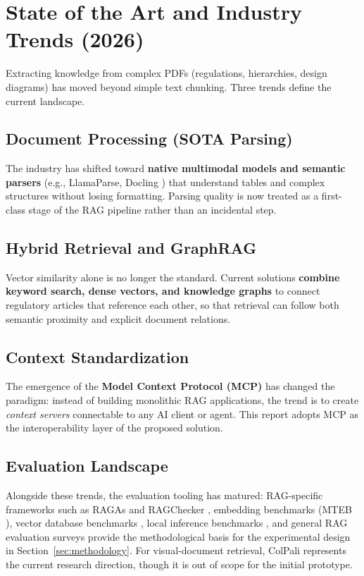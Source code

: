 \documentclass[11pt,a4paper]{article}
\begin{document}
\section{State of the Art and Industry Trends (2026)}
\label{sec:sota}

Extracting knowledge from complex PDFs (regulations, hierarchies, design
diagrams) has moved beyond simple text chunking. Three trends define the
current landscape.

\subsection{Document Processing (SOTA Parsing)}

The industry has shifted toward \textbf{native multimodal models and semantic
parsers} (e.g., LlamaParse, Docling \cite{docling}) that understand tables and
complex structures without losing formatting. Parsing quality is now treated
as a first-class stage of the RAG pipeline rather than an incidental step.

\subsection{Hybrid Retrieval and GraphRAG}

Vector similarity alone is no longer the standard. Current solutions
\textbf{combine keyword search, dense vectors, and knowledge graphs}
\cite{graphrag} to connect regulatory articles that reference each other, so
that retrieval can follow both semantic proximity and explicit document
relations.

\subsection{Context Standardization}

The emergence of the \textbf{Model Context Protocol (MCP)}
\cite{mcp-spec,mcp-sdk} has changed the paradigm: instead of building
monolithic RAG applications, the trend is to create \emph{context servers}
connectable to any AI client or agent. This report adopts MCP as the
interoperability layer of the proposed solution.

\subsection{Evaluation Landscape}

Alongside these trends, the evaluation tooling has matured: RAG-specific
frameworks such as RAGAs \cite{ragas} and RAGChecker \cite{ragchecker},
embedding benchmarks (MTEB \cite{mteb}), vector database benchmarks
\cite{vdbbench}, local inference benchmarks \cite{localbench}, and general RAG
evaluation surveys \cite{rag-survey} provide the methodological basis for the
experimental design in Section~\ref{sec:methodology}. For visual-document
retrieval, ColPali \cite{colpali} represents the current research direction,
though it is out of scope for the initial prototype.
\end{document}
